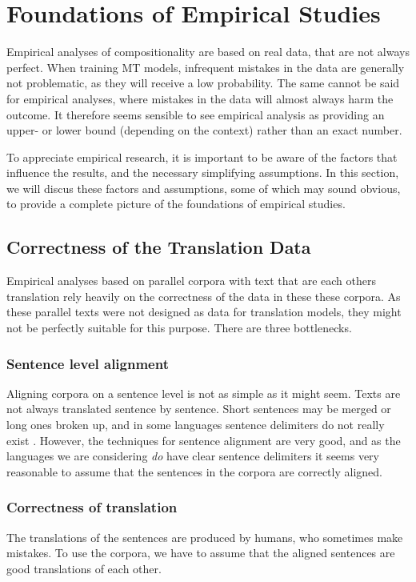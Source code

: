 \section{Foundations of Empirical Studies}
\label{sec:assumptions}

Empirical analyses of compositionality are based on real data, that are not always perfect. When training MT models, infrequent mistakes in the data are generally not problematic, as they will receive a low probability. The same cannot be said for empirical analyses, where mistakes in the data will almost always harm the outcome. It therefore seems sensible to see empirical analysis as providing an upper- or lower bound (depending on the context) rather than an exact number. 

To appreciate empirical research, it is important to be aware of the factors that influence the results, and the necessary simplifying assumptions. In this section, we will discus these factors and assumptions, some of which may sound obvious, to provide a complete picture of the foundations of empirical studies.

\subsection{Correctness of the Translation Data}

Empirical analyses based on parallel corpora with text that are each others translation rely heavily on the correctness of the data in these these corpora. As these parallel texts were not designed as data for translation models, they might not be perfectly suitable for this purpose. There are three bottlenecks.

\subsubsection{Sentence level alignment}
Aligning corpora on a sentence level is not as simple as it might seem. Texts are not always translated sentence by sentence. Short sentences may be merged or long ones broken up, and in some languages sentence delimiters do not really exist \citep[p.55]{koehn2008statistical}. However, the techniques for sentence alignment are very good, and as the languages we are considering \textit{do} have clear sentence delimiters it seems very reasonable to assume that the sentences in the corpora are correctly aligned.

\subsubsection{Correctness of translation}
The translations of the sentences are produced by humans, who sometimes make mistakes. To use the corpora, we have to assume that the aligned sentences are good translations of each other.

